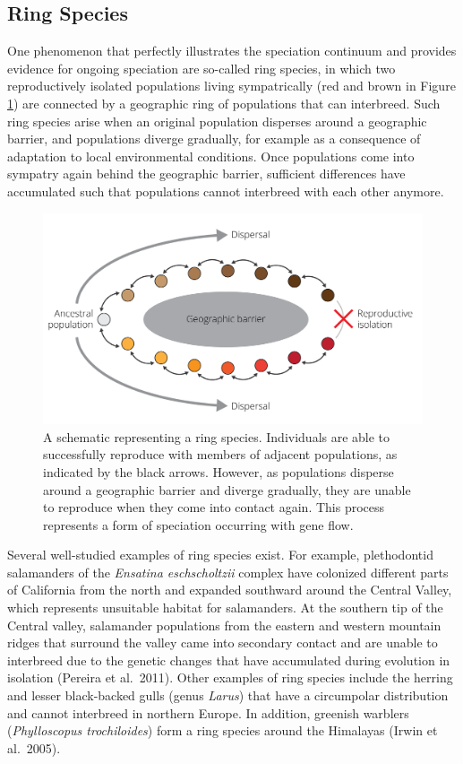 \documentclass[
]{book}
\begin{document}
\hypertarget{ring-species}{%
\subsection{Ring Species}\label{ring-species}}

One phenomenon that perfectly illustrates the speciation continuum and provides evidence for ongoing speciation are so-called ring species, in which two reproductively isolated populations living sympatrically (red and brown in Figure \ref{fig:ringspecies}) are connected by a geographic ring of populations that can interbreed. Such ring species arise when an original population disperses around a geographic barrier, and populations diverge gradually, for example as a consequence of adaptation to local environmental conditions. Once populations come into sympatry again behind the geographic barrier, sufficient differences have accumulated such that populations cannot interbreed with each other anymore.

\begin{figure}
\includegraphics[width=1\linewidth]{images/rings-species} \caption{A schematic representing a ring species. Individuals are able to successfully reproduce with members of adjacent populations, as indicated by the black arrows. However, as populations disperse around a geographic barrier and diverge gradually, they are unable to reproduce when they come into contact again. This process represents a form of speciation occurring with gene flow.}\label{fig:ringspecies}
\end{figure}

Several well-studied examples of ring species exist. For example, plethodontid salamanders of the \emph{Ensatina eschscholtzii} complex have colonized different parts of California from the north and expanded southward around the Central Valley, which represents unsuitable habitat for salamanders. At the southern tip of the Central valley, salamander populations from the eastern and western mountain ridges that surround the valley came into secondary contact and are unable to interbreed due to the genetic changes that have accumulated during evolution in isolation (Pereira et al.~2011). Other examples of ring species include the herring and lesser black-backed gulls (genus \emph{Larus}) that have a circumpolar distribution and cannot interbreed in northern Europe. In addition, greenish warblers (\emph{Phylloscopus trochiloides}) form a ring species around the Himalayas (Irwin et al.~2005).
\end{document}
